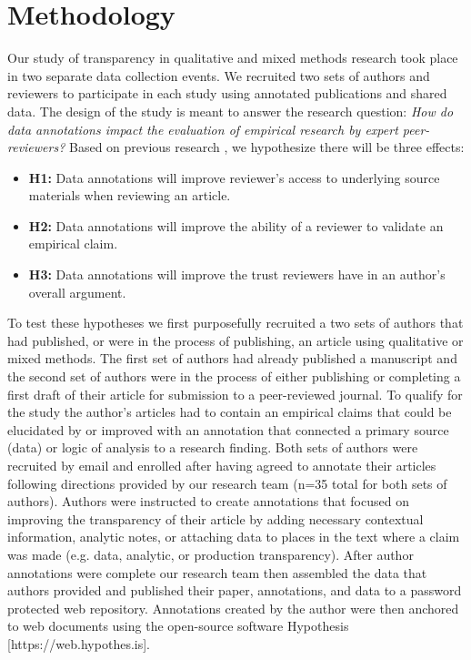 \documentclass[sigchi]{acmart}
\begin{document}
\section{Methodology}
Our study of transparency in qualitative and mixed methods research took place in two separate data collection events. We recruited two sets of authors and reviewers to participate in each study using annotated publications and shared data. The design of the study is meant to answer the research question: \textit{How do data annotations impact the evaluation of empirical research by expert peer-reviewers?} Based on previous research \cite{kratz_researcher_2015,morey_peer_2015,nicholls2016reporting}, we hypothesize there will be three effects: 
\begin{itemize}
\item \textbf{H1:} Data annotations will improve reviewer’s access to underlying source materials when reviewing an article.
\item \textbf{H2:} Data annotations will improve the ability of a reviewer to validate an empirical claim. 
\item \textbf{H3:} Data annotations will improve the trust reviewers have in an author’s overall argument. 
\end{itemize}

To test these hypotheses we first purposefully recruited a two sets of authors that had published, or were in the process of publishing, an article using qualitative or mixed methods. The first set of authors had already published a manuscript and the second set of authors were in the process of either publishing or completing a first draft of their article for submission to a peer-reviewed journal. To qualify for the study the author's articles had to contain an empirical claims that could be elucidated by or improved with an annotation that connected a primary source (data) or logic of analysis to a research finding. Both sets of authors were recruited by email and enrolled after having agreed to annotate their articles following directions provided by our research team (n=35 total for both sets of authors). Authors were instructed to create annotations that focused on improving the transparency of their article by adding necessary contextual information, analytic notes, or attaching data to places in the text where a claim was made (e.g. data, analytic, or production transparency). After author annotations were complete our research team then assembled the data that authors provided and published their paper, annotations, and data to a password protected web repository. Annotations created by the author were then anchored to web documents using the open-source software Hypothesis [https://web.hypothes.is]. 
\end{document}

